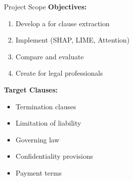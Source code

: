 \begin{frame}{Project Scope}
\textbf{Objectives:}
\begin{enumerate}
    \item Develop a  for clause extraction
    \item Implement  (SHAP, LIME, Attention)
    \item Compare and evaluate 
    \item Create  for legal professionals
\end{enumerate}

\vspace{0.5cm}
\textbf{Target Clauses:}
\begin{itemize}
    \item Termination clauses
    \item Limitation of liability
    \item Governing law
    \item Confidentiality provisions
    \item Payment terms
\end{itemize}
\end{frame}
